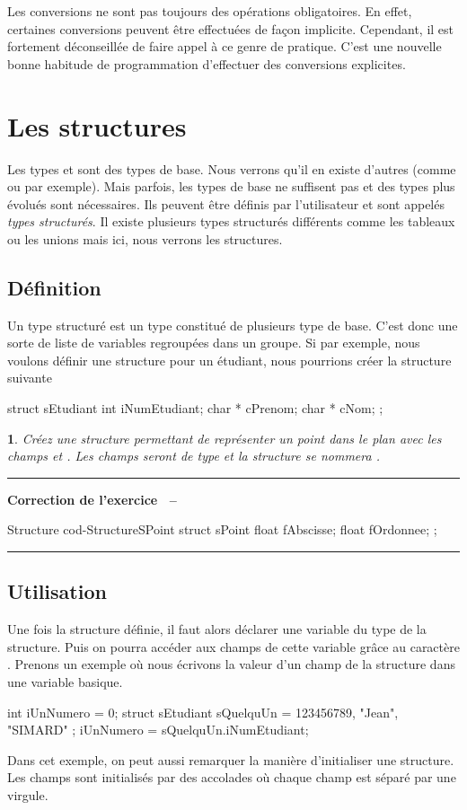 \documentclass[a4paper]{article}
\newenvironment{Correction}{\par\tiny\blue\rule[1ex]{\textwidth}{1pt}\par\normalsize\textbf{\sffamily{}Correction de l'exercice~\theExo{} -- }}{\par\tiny\blue\rule[1ex]{\textwidth}{1pt}\par}
\newtheorem{Exo}{{\sffamily{Exercice}}}
\begin{document}
{		Les conversions ne sont pas toujours des opérations obligatoires.
		En effet, certaines conversions peuvent être effectuées de façon implicite.
		Cependant, il est fortement déconseillée de faire appel à ce genre de pratique.
		C'est une nouvelle bonne habitude de programmation d'effectuer des conversions explicites.

	\section{Les structures}
		Les types  et  sont des types de base.
		Nous verrons qu'il en existe d'autres (comme  ou  par exemple).
		Mais parfois, les types de base ne suffisent pas et des types plus évolués sont nécessaires.
		Ils peuvent être définis par l'utilisateur et sont appelés \emph{types structurés}.
		Il existe plusieurs types structurés différents comme les tableaux ou les unions mais ici, nous verrons les structures.
		\subsection{Définition}
			Un type structuré est un type constitué de plusieurs type de base.
			C'est donc une sorte de liste de variables regroupées dans un groupe.
			Si par exemple, nous voulons définir une structure pour un étudiant, nous pourrions créer la structure suivante
			\begin{Code*}
struct sEtudiant
{
	int iNumEtudiant;
	char * cPrenom;
	char * cNom;
};
			\end{Code*}

			\begin{Exo}
				Créez une structure permettant de représenter un point dans le plan avec les champs  et .
				Les champs seront de type  et la structure se nommera .
			\end{Exo}
			\begin{Correction}
				\begin{Code}{Structure }{cod-StructureSPoint}
struct sPoint
{
	float fAbscisse;
	float fOrdonnee;
};
				\end{Code}
			\end{Correction}

		\subsection{Utilisation}
			Une fois la structure définie, il faut alors déclarer une variable du type de la structure.
			Puis on pourra accéder aux champs de cette variable grâce au caractère .
			Prenons un exemple où nous écrivons la valeur d'un champ de la structure dans une variable basique.
			\begin{Code*}
int iUnNumero = 0;
struct sEtudiant sQuelquUn = { 123456789, "Jean", "SIMARD" };
iUnNumero = sQuelquUn.iNumEtudiant;
			\end{Code*}
			Dans cet exemple, on peut aussi remarquer la manière d'initialiser une structure.
			Les champs sont initialisés par des accolades où chaque champ est séparé par une virgule.

}
\end{document}
